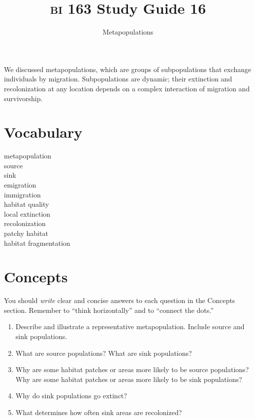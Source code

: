 \documentclass[letterpaper]{tufte-handout}
\title{{\scshape bi} 163 Study Guide 16}
\author{Metapopulations}
\date{} %
\begin{document}
\maketitle	%

We discussed metapopulations, which are groups of subpopulations that exchange individuals by migration.  Subpopulations are dynamic; their extinction and recolonization at any location depends on a complex interaction of migration and survivorship.

\section*{Vocabulary}

\vspace{-1\baselineskip}
\begin{multicols}{2}
metapopulation\\
source\\
sink\\
emigration\\
immigration\\
habitat quality\\
local extinction\\
recolonization\\
patchy habitat\\
habitat fragmentation
\end{multicols}

\section*{Concepts}

You should \emph{write} clear and concise answers to each question in the Concepts section.  Remember to ``think horizontally'' and to ``connect the dots.'' 

\begin{enumerate}

	\item Describe and illustrate a representative metapopulation.  Include source and sink populations.

	\item What are source populations? What are sink populations?

	\item Why are some habitat patches or areas more likely to be source populations? Why are some habitat patches or areas more likely to be sink populations?

	\item Why do sink populations go extinct?

	\item What determines how often sink areas are recolonized?

\end{enumerate}
\end{document}
